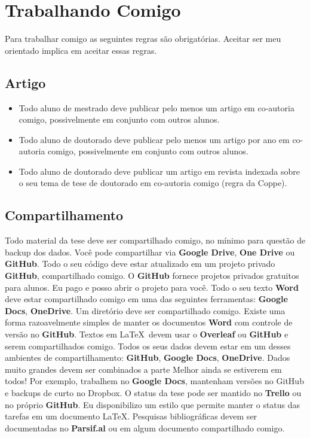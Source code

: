 	\chapter{Trabalhando Comigo}
    
Para trabalhar comigo as seguintes regras são obrigatórias. Aceitar ser meu orientado implica em aceitar essas regras.

\section{Artigo}

\begin{itemize}
    \item Todo aluno de mestrado deve publicar pelo menos um artigo em co-autoria comigo, possivelmente em conjunto com outros alunos.

    \item    Todo aluno de doutorado deve publicar pelo menos um artigo por ano em co-autoria comigo, possivelmente em conjunto com outros alunos.

    \item    Todo aluno de doutorado deve publicar um artigo em revista indexada sobre o seu tema de tese de doutorado em co-autoria comigo (regra da Coppe).

\end{itemize}

\section{Compartilhamento}
\begin{outline}
\1	Todo material da tese deve ser compartilhado comigo, no mínimo para questão de backup dos dados. Você pode compartilhar via \textbf{Google Drive}, \textbf{One Drive} ou \textbf{GitHub}.
\1	Todo o seu código deve estar atualizado em um projeto privado \textbf{GitHub}, compartilhado comigo. O \textbf{GitHub} fornece projetos privados gratuitos para alunos. Eu pago e posso abrir o projeto para você.
\1	Todo o seu texto \textbf{Word} deve estar compartilhado comigo em uma das seguintes ferramentas: \textbf{Google Docs}, \textbf{OneDrive}. Um diretório deve ser compartilhado comigo. Existe uma forma razoavelmente simples de manter os documentos \textbf{Word} com controle de versão no \textbf{GitHub}.
\1	Textos em \LaTeX\  devem usar o \textbf{Overleaf} ou \textbf{GitHub} e serem compartilhados comigo.
\1	Todos os seus dados devem estar em um desses ambientes de compartilhamento: \textbf{GitHub}, \textbf{Google Docs}, \textbf{OneDrive}.
\2	Dados muito grandes devem ser combinados a parte
\2	Melhor ainda se estiverem em todos! Por exemplo, trabalhem no \textbf{Google Docs}, mantenham versões no GitHub e backups de curto no Dropbox.
\1	O status da tese pode ser mantido no \textbf{Trello} ou no próprio \textbf{GitHub}.
\2 Eu disponibilizo um estilo que permite manter o status das tarefas em um documento \LaTeX.
\1	Pesquisas bibliográficas devem ser documentadas no \textbf{Parsif.al} ou em algum documento compartilhado comigo.
\end{outline}

